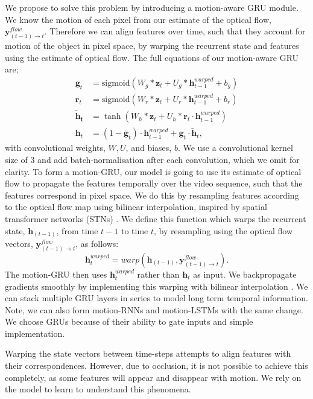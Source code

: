 We propose to solve this problem by introducing a motion-aware GRU module. We know the motion of each pixel from our estimate of the optical flow, $\mathbf{y}^{flow}_{(t-1) \to t}$. Therefore we can align features over time, such that they account for motion of the object in pixel space, by warping the recurrent state and features using the estimate of optical flow. The full equations of our motion-aware GRU are;
\begin{align}
\mathbf{g}_t &= \text{sigmoid}(W_g * \mathbf{z}_t + U_g * \mathbf{h}^{warped}_{t-1} + b_g) \\
\mathbf{r}_t &= \text{sigmoid}(W_r * \mathbf{z}_t + U_r * \mathbf{h}^{warped}_{t-1} + b_r) \\
\mathbf{\widetilde{h}_t} &= \tanh (W_h * \mathbf{z}_t + U_h * \mathbf{r}_t \cdot \mathbf{h}^{warped}_{t-1}) \\
\mathbf{h}_t &= (1-\mathbf{g}_t) \cdot \mathbf{h}^{warped}_{t-1} + \mathbf{g}_t \cdot \mathbf{\widetilde{h}}_t,
\end{align}
with convolutional weights, $W, U$, and biases, $b$. We use a convolutional kernel size of 3 and add batch-normalisation after each convolution, which we omit for clarity. To form a motion-GRU, our model is going to use its estimate of optical flow to propagate the features temporally over the video sequence, such that the features correspond in pixel space. We do this by resampling features according to the optical flow map using bilinear interpolation, inspired by spatial transformer networks (STNs) \citep{jaderberg2015spatial}.
We define this function which warps the recurrent state, $\mathbf{h}_{(t-1)}$, from time $t-1$ to time $t$, by resampling using the optical flow vectors, $\mathbf{y}^{flow}_{(t-1) \to t}$, as follows:
\begin{equation}
\mathbf{h}^{warped}_{t} = warp(\mathbf{h}_{(t-1)}, \mathbf{y}^{flow}_{(t-1) \to t}).
\end{equation}
The motion-GRU then uses $\mathbf{h}^{warped}_{t}$ rather than $\mathbf{h}_t$ as input. We backpropagate gradients smoothly by implementing this warping with bilinear interpolation \citep{jaderberg2015spatial}. We can stack multiple GRU layers in series to model long term temporal information. Note, we can also form motion-RNNs and motion-LSTMs with the same change. We choose GRUs because of their ability to gate inputs and simple implementation.

Warping the state vectors between time-steps attempts to align features with their correspondences. However, due to occlusion, it is not possible to achieve this completely, as some features will appear and disappear with motion. We rely on the model to learn to understand this phenomena.

